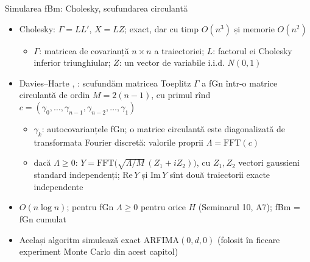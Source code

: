 \begin{frame}{Simularea fBm: Cholesky, scufundarea circulantă}
\itemsize{\small}
\begin{itemize}
    \item Cholesky: $\Gamma = LL'$, $X = LZ$; exact, dar cu timp $O(n^3)$ și memorie $O(n^2)$
    \begin{itemize}
        \item $\Gamma$: matricea de covarianță $n \times n$ a traiectoriei; $L$: factorul ei Cholesky inferior triunghiular; $Z$: un vector de variabile i.i.d. $N(0, 1)$
    \end{itemize}
    \item Davies--Harte , : scufundăm matricea Toeplitz $\Gamma$ a fGn într-o matrice circulantă de ordin $M = 2(n - 1)$, cu primul rînd $c = (\gamma_0, \dots, \gamma_{n-1}, \gamma_{n-2}, \dots, \gamma_1)$
    \begin{itemize}
        \item $\gamma_k$: autocovarianțele fGn; o matrice circulantă este diagonalizată de transformata Fourier discretă: valorile proprii $\Lambda = \mathrm{FFT}(c)$
        \item dacă $\Lambda \ge 0$: $Y = \mathrm{FFT}\big(\sqrt{\Lambda/M}\,(Z_1 + iZ_2)\big)$, cu $Z_1, Z_2$ vectori gaussieni standard independenți; $\mathrm{Re}\,Y$ și $\mathrm{Im}\,Y$ sînt două traiectorii exacte independente
    \end{itemize}
    \item $O(n\log n)$; pentru fGn $\Lambda \ge 0$ pentru orice $H$ (Seminarul 10, A7); fBm = fGn cumulat
    \item Același algoritm simulează exact ARFIMA$(0,d,0)$ (folosit în fiecare experiment Monte Carlo din acest capitol)
\end{itemize}
\end{frame}

